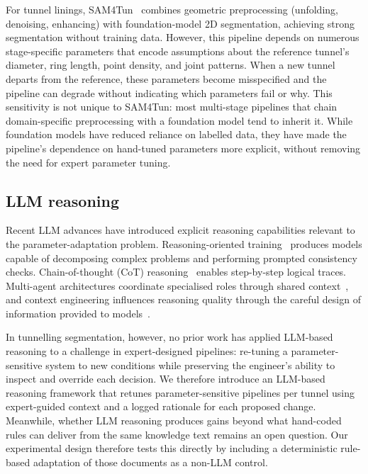 \documentclass[a4paper,fleqn]{cas-dc}
\begin{document}
{For tunnel linings, SAM4Tun~\cite{ye2025sam4tun} combines geometric preprocessing (unfolding, denoising, enhancing) with foundation-model 2D segmentation, achieving strong segmentation without training data. However, this pipeline depends on numerous stage-specific parameters that encode assumptions about the reference tunnel's diameter, ring length, point density, and joint patterns. When a new tunnel departs from the reference, these parameters become misspecified and the pipeline can degrade without indicating which parameters fail or why. This sensitivity is not unique to SAM4Tun: most multi-stage pipelines that chain domain-specific preprocessing with a foundation model tend to inherit it. While foundation models have reduced reliance on labelled data, they have made the pipeline's dependence on hand-tuned parameters more explicit, without removing the need for expert parameter tuning.

\subsection{LLM reasoning}

Recent LLM advances have introduced explicit reasoning capabilities relevant to the parameter-adaptation problem. Reasoning-oriented training~\cite{ouyang2022training, deepseek2025analysis, chua2025deepseek, xiang2025metacot, openai2025o3, openai2025reasoningbestpractices} produces models capable of decomposing complex problems and performing prompted consistency checks. Chain-of-thought (CoT) reasoning~\cite{wei2023cot, kojima2023zeroshot} enables step-by-step logical traces. Multi-agent architectures coordinate specialised roles through shared context~\cite{hong2024metagpt, qian2024chatdev, chen2024comm, zhang2023igniting, zhang2024chain}, and context engineering influences reasoning quality through the careful design of information provided to models~\cite{xu2024retrieval, mei2025survey, anthropic2025context}.

In tunnelling segmentation, however, no prior work has applied LLM-based reasoning to a challenge in expert-designed pipelines: re-tuning a parameter-sensitive system to new conditions while preserving the engineer's ability to inspect and override each decision. We therefore introduce an LLM-based reasoning framework that retunes parameter-sensitive pipelines per tunnel using expert-guided context and a logged rationale for each proposed change. Meanwhile, whether LLM reasoning produces gains beyond what hand-coded rules can deliver from the same knowledge text remains an open question. Our experimental design therefore tests this directly by including a deterministic rule-based adaptation of those documents as a non-LLM control.




}
\end{document}
